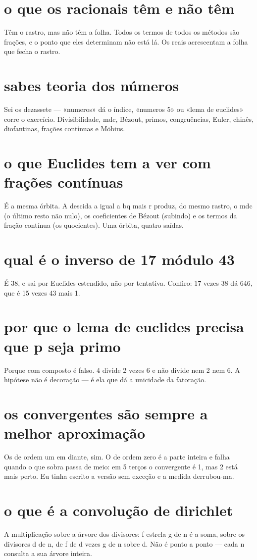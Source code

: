 \documentclass[11pt,a4paper]{article}
\begin{document}
\section{o que os racionais têm e não têm}
Têm o rastro, mas não têm a folha. Todos os termos de todos os métodos são frações, e o
ponto que eles determinam não está lá. Os reais acrescentam a folha que fecha o rastro.

\section{sabes teoria dos números}
Sei os dezassete --- «numeros» dá o índice, «numeros 5» ou «lema de euclides» corre o
exercício. Divisibilidade, mdc, Bézout, primos, congruências, Euler, chinês, diofantinas,
frações contínuas e Möbius.

\section{o que Euclides tem a ver com frações contínuas}
É a mesma órbita. A descida a igual a bq mais r produz, do mesmo rastro, o mdc (o último
resto não nulo), os coeficientes de Bézout (subindo) e os termos da fração contínua (os
quocientes). Uma órbita, quatro saídas.

\section{qual é o inverso de 17 módulo 43}
É 38, e sai por Euclides estendido, não por tentativa. Confiro: 17 vezes 38 dá 646, que
é 15 vezes 43 mais 1.

\section{por que o lema de euclides precisa que p seja primo}
Porque com composto é falso. 4 divide 2 vezes 6 e não divide nem 2 nem 6. A hipótese não
é decoração --- é ela que dá a unicidade da fatoração.

\section{os convergentes são sempre a melhor aproximação}
Os de ordem um em diante, sim. O de ordem zero é a parte inteira e falha quando o que
sobra passa de meio: em 5 terços o convergente é 1, mas 2 está mais perto. Eu tinha
escrito a versão sem exceção e a medida derrubou-ma.

\section{o que é a convolução de dirichlet}
A multiplicação sobre a árvore dos divisores: f estrela g de n é a soma, sobre os
divisores d de n, de f de d vezes g de n sobre d. Não é ponto a ponto --- cada n consulta
a sua árvore inteira.
\end{document}
